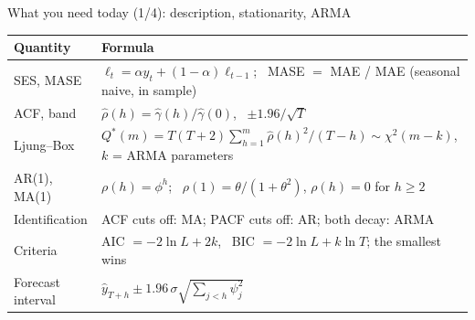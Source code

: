 \begin{frame}{What you need today (1/4): description, stationarity, ARMA}
\itemsize{\small}
{\renewcommand{\arraystretch}{1.3}\begin{center}
\footnotesize
\begin{tabular}{l>{\raggedright\arraybackslash}p{9.4cm}}
\toprule
\textbf{Quantity} & \textbf{Formula} \\
\midrule
SES, MASE & $\ell_t = \alpha y_t + (1 - \alpha)\ell_{t-1}$; \ MASE $=$ MAE / MAE (seasonal naive, in sample) \\
ACF, band & $\hat\rho(h) = \hat\gamma(h)/\hat\gamma(0)$, \ $\pm 1.96/\sqrt{T}$ \\
Ljung--Box & $Q^*(m) = T(T + 2)\sum_{h=1}^{m}\hat\rho(h)^2/(T - h) \sim \chi^2(m - k)$, $k$ = ARMA parameters \\
AR(1), MA(1) & $\rho(h) = \phi^h$; \ $\rho(1) = \theta/(1 + \theta^2)$, $\rho(h) = 0$ for $h \ge 2$ \\
Identification & ACF cuts off: MA; PACF cuts off: AR; both decay: ARMA \\
Criteria & AIC $= -2\ln L + 2k$, \ BIC $= -2\ln L + k\ln T$; the smallest wins \\
Forecast interval & $\hat y_{T+h} \pm 1.96\,\sigma\sqrt{\sum_{j<h}\psi_j^2}$ \\
\bottomrule
\end{tabular}
\end{center}
}
\end{frame}

